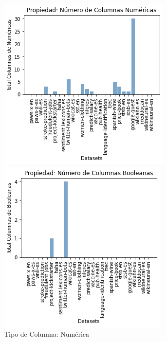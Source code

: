 \begin{figure}
  \centering
    \begin{minipage}[b]{0.31\textwidth}
        \centering
        \includegraphics[width=\textwidth]{Graphics/results/columns_n.png}
          \caption{Tipo de Columna: Numérica}
          \label{fig:columns-n}
    \end{minipage}    
\hspace{0.01cm}
    \begin{minipage}[b]{0.31\textwidth}
      \centering
      \includegraphics[width=\textwidth]{Graphics/results/columns_b.png}

\end{minipage}
\end{figure}
